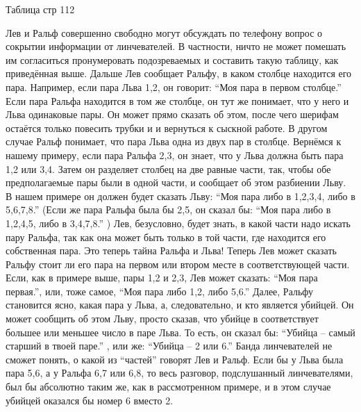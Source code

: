                        Таблица стр 112




  Лев и Ральф совершенно свободно могут обсуждать по телефону вопрос о сокрытии информации от линчевателей. В частности, ничто не  может помешать им согласиться пронумеровать подозреваемых и составить такую таблицу, как приведённая выше.
  Дальше Лев сообщает Ральфу, в каком столбце находится его пара. Например, если пара Льва {1,2}, он говорит: “Моя пара в первом столбце.” 
  Если пара Ральфа находится в том же столбце, он тут же понимает, что у него и Льва одинаковые пары. Он может прямо сказать об этом,  после чего шерифам остаётся только повесить трубки и и вернуться к сыскной работе.
  В другом случае Ральф понимает, что пара Льва одна из двух пар в столбце. Вернёмся к нашему примеру, если пара Ральфа {2,3}, он знает, что у Льва должна быть пара  {1,2} или {3,4}. Затем он разделяет столбец на две равные части, так, чтобы обе предполагаемые пары были в одной части, и сообщает об этом разбиении Льву.
   В нашем примере он должен будет сказать Льву: “Моя пара либо в {1,2,3,4}, либо в {5,6,7,8}.” (Если же пара Ральфа была бы {2,5}, он сказал бы: “Моя пара либо в {1,2,4,5}, либо в {3,4,7,8}.” )
   Лев, безусловно, будет знать, в какой части надо искать пару Ральфа, так как она может быть только в той части, где находится его собственная пара. Это теперь тайна Ральфа и Льва!
  Теперь Лев может сказать Ральфу стоит ли его пара на первом или втором месте в соответствующей части. Если, как в примере выше, пары {1,2} и {2,3}, Лев может сказать: “Моя пара первая.”, или, тоже самое, “Моя пара либо {1,2}, либо {5,6}.”
  Далее, Ральфу становится ясно, какая пара у Льва, а, следовательно, и кто является убийцей. Он может сообщить об этом Льву, просто сказав, что убийце в  соответствует большее или меньшее число в паре Льва. То есть, он сказал бы: “Убийца -- самый старший в твоей паре.” , или же: “Убийца -- 2 или 6.”
  Банда линчевателей не сможет понять, о какой из “частей” говорят Лев и Ральф.
Если бы у Льва была пара {5,6}, а у Ральфа {6,7} или {6,8}, то весь разговор, подслушанный линчевателями, был бы абсолютно таким же, как в рассмотренном примере, и в этом случае убийцей оказался бы номер 6 вместо 2.


